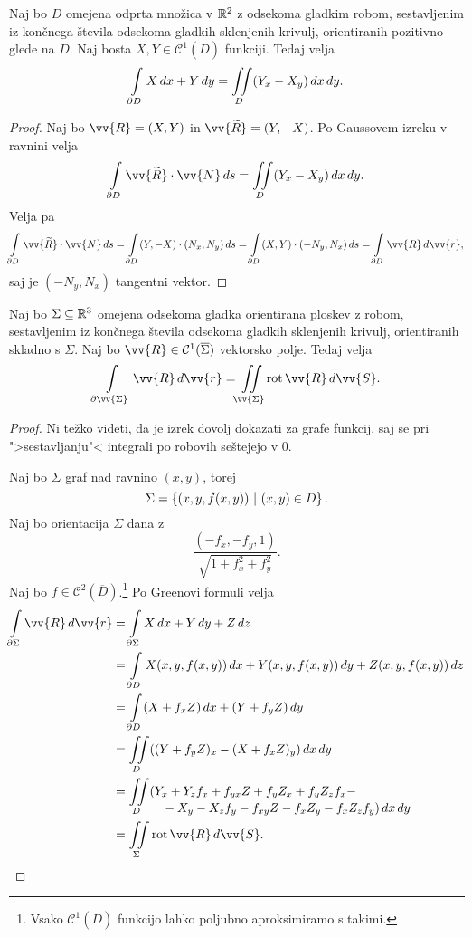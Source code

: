 \begin{izrek}
Naj bo $D$ omejena odprta množica v $\mathbb{R}^2$ z odsekoma gladkim
robom, sestavljenim iz končnega števila odsekoma gladkih sklenjenih
krivulj, orientiranih pozitivno glede na $D$. Naj bosta
$X, Y \in \mathcal{C}^1(\overline{D})$ funkciji. Tedaj velja
\[
\int\limits_{\partial D} X\,dx + Y\,dy = \iint\limits_D (Y_x - X_y)\,dx\,dy.
\]
\end{izrek}

\begin{proof}
Naj bo $\vv{R} = (X, Y)$ in $\vv{\widetilde{R}} = (Y, -X)$. Po
Gaussovem izreku v ravnini velja
\[
\lint_{\partial D} \vv{\widetilde{R}} \cdot \vv{N}\,ds =
\liint_D (Y_x - X_y)\,dx\,dy.
\]
Velja pa
\[
\lint_{\partial D} \vv{\widetilde{R}} \cdot \vv{N}\,ds =
\lint_{\partial D} (Y, -X) \cdot (N_x, N_y)\,ds =
\lint_{\partial D} (X, Y) \cdot (-N_y, N_x)\,ds =
\lint_{\partial D} \vv{R}\,d\vv{r},
\]
saj je $(-N_y, N_x)$ tangentni vektor.
\end{proof}

\begin{izrek}[Stokes]
Naj bo $\Sigma \subseteq \mathbb{R}^3$ omejena odsekoma gladka orientirana
ploskev z robom, sestavljenim iz končnega števila odsekoma gladkih
sklenjenih krivulj, orientiranih skladno s $\Sigma$. Naj bo
$\vv{R} \in \mathcal{C}^1(\overline{\Sigma})$ vektorsko polje.
Tedaj velja
\[
\lint_{\partial \vv{\Sigma}} \vv{R}\,d\vv{r} =
\liint_{\vv{\Sigma}} \rot\vv{R}\,d\vv{S}.
\]
\end{izrek}

\begin{proof}
Ni težko videti, da je izrek dovolj dokazati za grafe funkcij, saj
se pri ">sestavljanju"< integrali po robovih seštejejo v $0$.

Naj bo $\Sigma$ graf nad ravnino $(x, y)$, torej
\[
\Sigma = \left\{(x, y, f(x, y))~\middle\vert~(x, y) \in D\right\}.
\]
Naj bo orientacija $\Sigma$ dana z
\[
\frac{(-f_x, -f_y, 1)}{\sqrt{1 + f_x^2 + f_y^2}}.
\]
Naj bo $f \in \mathcal{C}^2(\overline{D})$.\footnote{Vsako
$\mathcal{C}^1(\overline{D})$ funkcijo lahko poljubno aproksimiramo
s takimi.} Po Greenovi formuli velja
\begin{align*}
\lint_{\partial \Sigma} \vv{R}\,d\vv{r} &=
\lint_{\partial \Sigma} X\,dx + Y\,dy + Z\,dz
\\
&=
\lint_{\partial D}
X(x, y, f(x, y))\,dx +
Y(x, y, f(x, y))\,dy +
Z(x, y, f(x, y))\,dz
\\
&=
\lint_{\partial D} (X + f_x Z)\,dx + (Y + f_y Z)\,dy
\\
&=
\liint_D ((Y + f_y Z)_x - (X + f_x Z)_y)\,dx\,dy
\\
&=
\liint_D (Y_x + Y_z f_x + f_{yx} Z + f_y Z_x + f_y Z_z f_x -
\\[-15pt]
& \qquad \qquad
-X_y - X_z f_y - f_{xy} Z - f_x Z_y - f_x Z_z f_y)\,dx\,dy
\\
&=
\liint_\Sigma \rot\vv{R}\,d\vv{S}. \qedhere
\end{align*}
\end{proof}

